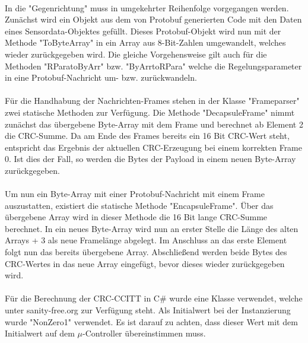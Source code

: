 \paragraph{}
In die "Gegenrichtung" muss in umgekehrter Reihenfolge vorgegangen werden. Zunächst wird ein Objekt aus dem von Protobuf generierten Code mit den Daten eines Sensordata-Objektes gefüllt. Dieses Protobuf-Objekt wird nun mit der Methode "ToByteArray" in ein Array aus 8-Bit-Zahlen umgewandelt, welches wieder zurückgegeben wird. Die gleiche Vorgehensweise gilt auch für die Methoden "RParatoByArr" bzw. "ByArrtoRPara" welche die Regelungsparameter in eine Protobuf-Nachricht um- bzw. zurückwandeln.
\paragraph{}
Für die Handhabung der Nachrichten-Frames stehen in der Klasse "Frameparser" zwei statische Methoden zur Verfügung. Die Methode "DecapsuleFrame" nimmt zunächst das übergebene Byte-Array mit dem Frame und berechnet ab Element 2 die CRC-Summe. Da am Ende des Frames bereits ein 16 Bit CRC-Wert steht, entspricht das Ergebnis der aktuellen CRC-Erzeugung bei einem korrekten Frame 0. Ist dies der Fall, so werden die Bytes der Payload in einem neuen Byte-Array zurückgegeben.
\paragraph{}
Um nun ein Byte-Array mit einer Protobuf-Nachricht mit einem Frame auszustatten, existiert die statische Methode "EncapsuleFrame". Über das übergebene Array wird in dieser Methode die 16 Bit lange CRC-Summe berechnet. In ein neues Byte-Array wird nun an erster Stelle die Länge des alten Arrays + 3 als neue Framelänge abgelegt. Im Anschluss an das erste Element folgt nun das bereits übergebene Array. Abschließend werden beide Bytes des CRC-Wertes in das neue Array eingefügt, bevor dieses wieder zurückgegeben wird.
\paragraph{}
Für die Berechnung der CRC-CCITT in C\# wurde eine Klasse verwendet, welche unter sanity-free.org \cite{crc} zur Verfügung steht. Als Initialwert bei der Instanzierung wurde "NonZero1" verwendet. Es ist darauf zu achten, dass dieser Wert mit dem Initialwert auf dem $\mu$-Controller übereinstimmen muss.
